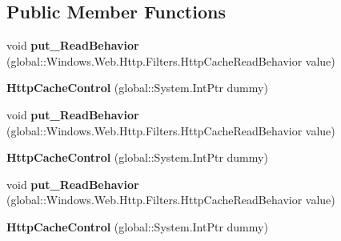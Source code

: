 \subsection*{Public Member Functions}
\begin{DoxyCompactItemize}
\item 
\mbox{\label{class_windows_1_1_web_1_1_http_1_1_filters_1_1_http_cache_control_ac254653144debdcc0c0dbe3d16a5e4da}} 
void {\bfseries put\+\_\+\+Read\+Behavior} (global\+::\+Windows.\+Web.\+Http.\+Filters.\+Http\+Cache\+Read\+Behavior value)
\item 
\mbox{\label{class_windows_1_1_web_1_1_http_1_1_filters_1_1_http_cache_control_ad81fe77a24560ec3da2c94c70ad495c8}} 
{\bfseries Http\+Cache\+Control} (global\+::\+System.\+Int\+Ptr dummy)
\item 
\mbox{\label{class_windows_1_1_web_1_1_http_1_1_filters_1_1_http_cache_control_ac254653144debdcc0c0dbe3d16a5e4da}} 
void {\bfseries put\+\_\+\+Read\+Behavior} (global\+::\+Windows.\+Web.\+Http.\+Filters.\+Http\+Cache\+Read\+Behavior value)
\item 
\mbox{\label{class_windows_1_1_web_1_1_http_1_1_filters_1_1_http_cache_control_ad81fe77a24560ec3da2c94c70ad495c8}} 
{\bfseries Http\+Cache\+Control} (global\+::\+System.\+Int\+Ptr dummy)
\item 
\mbox{\label{class_windows_1_1_web_1_1_http_1_1_filters_1_1_http_cache_control_ac254653144debdcc0c0dbe3d16a5e4da}} 
void {\bfseries put\+\_\+\+Read\+Behavior} (global\+::\+Windows.\+Web.\+Http.\+Filters.\+Http\+Cache\+Read\+Behavior value)
\item 
\mbox{\label{class_windows_1_1_web_1_1_http_1_1_filters_1_1_http_cache_control_ad81fe77a24560ec3da2c94c70ad495c8}} 
{\bfseries Http\+Cache\+Control} (global\+::\+System.\+Int\+Ptr dummy)
\item 
\mbox{\label{class_windows_1_1_web_1_1_http_1_1_filters_1_1_http_cache_control_ac254653144debdcc0c0dbe3d16a5e4da}} 

\end{DoxyCompactItemize}
